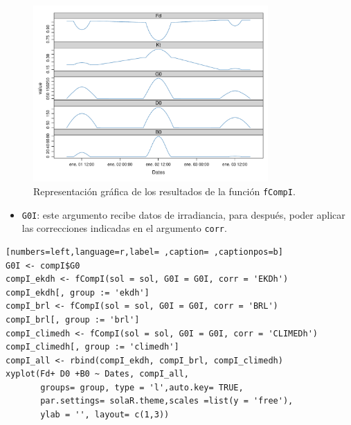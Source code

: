 \begin{itemize}
\begin{figure}[!htb]
\centering
\includegraphics[width=0.8\textwidth]{figuras/codigo-fcompicompd.pdf}
\caption{Representación gráfica de los resultados de la función \texttt{fCompI}.}
\end{figure}
\begin{itemize}
\item \texttt{G0I}: este argumento recibe datos de irradiancia, para después, poder aplicar las correcciones indicadas en el argumento \texttt{corr}.
\end{itemize}
\begin{lstlisting}[numbers=left,language=r,label= ,caption= ,captionpos=b]
G0I <- compI$G0
compI_ekdh <- fCompI(sol = sol, G0I = G0I, corr = 'EKDh')
compI_ekdh[, group := 'ekdh']
compI_brl <- fCompI(sol = sol, G0I = G0I, corr = 'BRL')
compI_brl[, group := 'brl']
compI_climedh <- fCompI(sol = sol, G0I = G0I, corr = 'CLIMEDh')
compI_climedh[, group := 'climedh']
compI_all <- rbind(compI_ekdh, compI_brl, compI_climedh)
xyplot(Fd+ D0 +B0 ~ Dates, compI_all,
       groups= group, type = 'l',auto.key= TRUE,
       par.settings= solaR.theme,scales =list(y = 'free'),
       ylab = '', layout= c(1,3))
\end{lstlisting}


\end{itemize}
